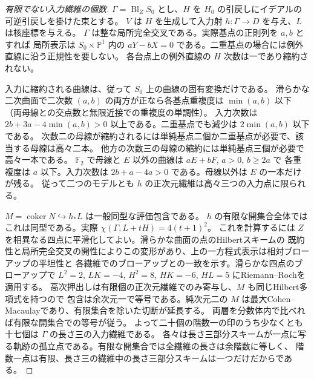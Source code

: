 \begin{proof}[有限でない入力繊維の個数]
$\Gamma=\operatorname{Bl}_Z S_0$ とし、$H$ を $H_0$ の引戻しにイデアルの可逆引戻しを掛けた束とする。
$V$ は $H$ を生成して入力射 $h:\Gamma\to D$ を与え、$L$ は核座標を与える。
$\Gamma$ は整な局所完全交叉である。実際基点の正則列を $a,b$ とすれば
局所表示は $S_0\times\mathbb P^1$ 内の $aY-bX=0$ である。二重基点の場合には例外直線に沿う正規性を要しない。
各台点上の例外直線の $H$ 次数は一であり縮約されない。

入力に縮約される曲線は、従って $S_0$ 上の曲線の固有変換だけである。
滑らかな二次曲面で二次数 $(a,b)$ の両方が正なら各基点重複度は $\min(a,b)$ 以下
（両母線との交点数と無限近接での重複度の単調性）。
入力次数は $2b+3a-4\min(a,b)>0$ 以上である。二重基点でも減少は $2\min(a,b)$ 以下である。
次数二の母線が縮約されるには単純基点二個か二重基点が必要で、該当する母線は高々二本。
他方の次数三の母線の縮約には単純基点三個が必要で高々一本である。
$\mathbb F_2$ で母線と $E$ 以外の曲線は $aE+bF$, $a>0$, $b\ge2a$ で
各重複度は $a$ 以下。入力次数は $2b+a-4a>0$ である。母線以外は $E$ の一本だけが残る。
従って二つのモデルとも $h$ の正次元繊維は高々三つの入力点に限られる。

$M=\operatorname{coker}N\hookrightarrow h_*L$ は一般同型な評価包含である。
$h$ の有限な開集合全体ではこれは同型である。実際 $\chi(\Gamma,L+tH)=4(t+1)^2$。
これを計算するには $Z$ を相異なる四点に平滑化してよい。滑らかな曲面の点のHilbertスキームの
既約性と局所完全交叉の開性によりこの変形があり、上の一方程式表示は相対ブローアップの平坦性と
各繊維でのブローアップとの一致を示す。滑らかな四点のブローアップで
$L^2=2$, $LK=-4$, $H^2=8$, $HK=-6$, $HL=5$ にRiemann--Rochを適用する。
高次押出しは有限個の正次元繊維でのみ寄与し、$M$ も同じHilbert多項式を持つので
包含は余次元一で等号である。純次元二の $M$ は最大Cohen--Macaulayであり、有限集合を除いた切断が延長する。
両層を分数体内で比べれば有限な開集合での等号が従う。
よって二十個の階数一の印のうち少なくとも十七個は $\Gamma$ の長さ三の入力繊維である。
各々は長さ三部分スキームが一点に写る軌跡の孤立点である。有限な開集合では全繊維の長さは余階数に等しく、
階数一点は有限、長さ三の繊維中の長さ三部分スキームは一つだけだからである。
\end{proof}

